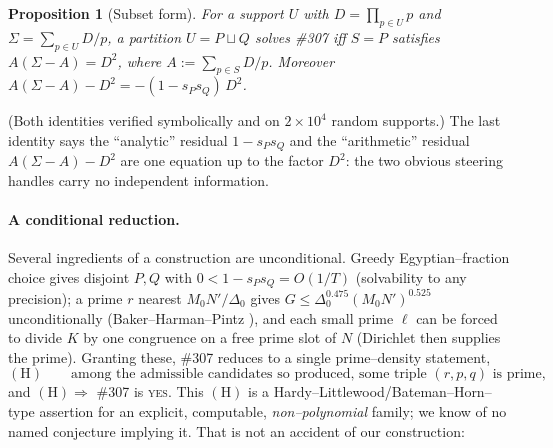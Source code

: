 \documentclass[11pt]{article}
\newtheorem{proposition}[theorem]{Proposition}
\theoremstyle{definition}
\begin{document}
\begin{proposition}[Subset form]\label{prop:subset}
For a support $U$ with $D=\prod_{p\in U}p$ and $\Sigma=\sum_{p\in U}D/p$, a partition $U=P\sqcup Q$
solves \#307 iff $S=P$ satisfies $A(\Sigma-A)=D^2$, where $A:=\sum_{p\in S}D/p$. Moreover
$A(\Sigma-A)-D^2=-(1-s_Ps_Q)\,D^2$.
\end{proposition}

(Both identities verified symbolically and on $2\times10^4$ random supports.) The last identity says
the ``analytic'' residual $1-s_Ps_Q$ and the ``arithmetic'' residual $A(\Sigma-A)-D^2$ are one
equation up to the factor $D^2$: the two obvious steering handles carry no independent information.

\paragraph{A conditional reduction.} Several ingredients of a construction are unconditional. Greedy
Egyptian--fraction choice gives disjoint $P,Q$ with $0<1-s_Ps_Q=O(1/T)$ (solvability to any
precision); a prime $r$ nearest $M_0N'/\Delta_0$ gives $G\le\Delta_0^{0.475}(M_0N')^{0.525}$
unconditionally (Baker--Harman--Pintz \cite{BHP2001}), and each small prime $\ell$ can be forced to
divide $K$ by one congruence on a free prime slot of $N$ (Dirichlet then supplies the prime).
Granting these, \#307 reduces to a single prime--density statement,
\[
(\mathrm{H})\qquad\text{among the admissible candidates so produced, some triple $(r,p,q)$ is prime,}
\]
and $(\mathrm{H})\Rightarrow$ \#307 is \textsc{yes}. This $(\mathrm{H})$ is a
Hardy--Littlewood/Bateman--Horn--type assertion for an explicit, computable, \emph{non--polynomial}
family; we know of no named conjecture implying it. That is not an accident of our construction:
\end{document}
